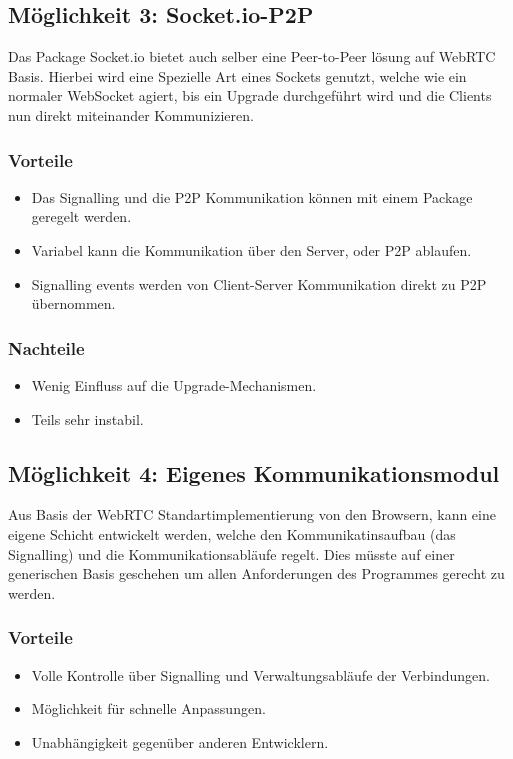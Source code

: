\subsection{Möglichkeit 3: Socket.io-P2P}
Das Package Socket.io bietet auch selber eine Peer-to-Peer lösung auf WebRTC 
Basis. Hierbei wird eine Spezielle Art eines Sockets genutzt, welche wie ein 
normaler WebSocket agiert, bis ein Upgrade durchgeführt wird und die Clients nun 
direkt miteinander Kommunizieren.

\subsubsection{Vorteile}
\begin{itemize}
\item
Das Signalling und die P2P Kommunikation können mit einem Package geregelt 
werden.

\item
Variabel kann die Kommunikation über den Server, oder P2P ablaufen.

\item
Signalling events werden von Client-Server Kommunikation direkt zu P2P 
übernommen.
\end{itemize}

\subsubsection{Nachteile}
\begin{itemize}
\item
Wenig Einfluss auf die Upgrade-Mechanismen.

\item
Teils sehr instabil.
\end{itemize}



\subsection{Möglichkeit 4: Eigenes Kommunikationsmodul}
Aus Basis der WebRTC Standartimplementierung von den Browsern, kann eine eigene Schicht entwickelt werden, welche den Kommunikatinsaufbau (das Signalling) und die Kommunikationsabläufe regelt. 
Dies müsste auf einer generischen Basis geschehen um allen Anforderungen des Programmes gerecht zu werden.

\subsubsection{Vorteile}
\begin{itemize}
\item
Volle Kontrolle über Signalling und Verwaltungsabläufe der Verbindungen.

\item
Möglichkeit für schnelle Anpassungen.

\item
Unabhängigkeit gegenüber anderen Entwicklern.
\end{itemize}

